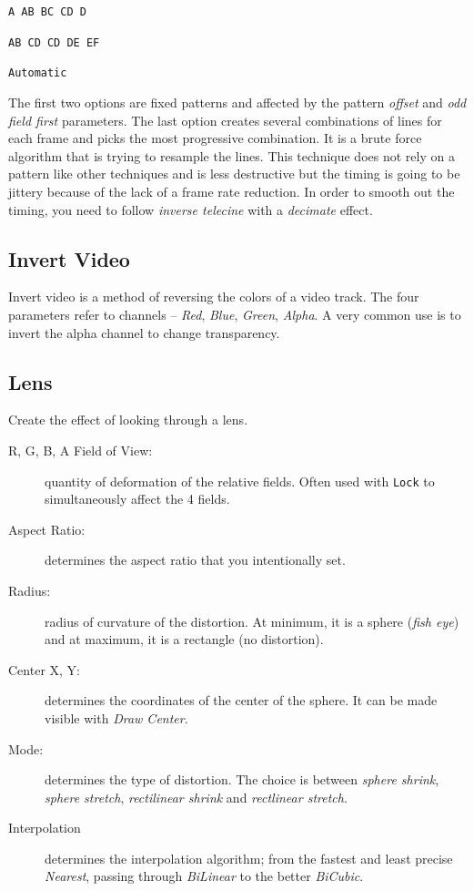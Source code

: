 \texttt{A AB BC CD D}
 
\texttt{AB CD CD DE EF} 

\texttt{Automatic}

The first two options are fixed patterns and affected by the pattern \textit{offset} and \textit{odd field first} parameters. The last option creates several combinations of lines for each frame and picks the most progressive combination. It is a brute force algorithm that is trying to resample the lines. This technique does not rely on a pattern like other techniques and is less destructive but the timing is going to be jittery because of the lack of a frame rate reduction. In order to smooth out the timing, you need to follow \textit{inverse telecine} with a \textit{decimate} effect.

\subsection{Invert Video}%
\label{sub:invert_video}

Invert video is a method of reversing the colors of a video track. The four parameters refer to channels -- \textit{Red}, \textit{Blue}, \textit{Green}, \textit{Alpha}. A very common use is to invert the alpha channel to change transparency.

\subsection{Lens}%
\label{sub:lens}

Create the effect of looking through a lens.

\begin{description}
    \item[R, G, B, A Field of View:] quantity of deformation of the relative fields. Often used with \texttt{Lock} to simultaneously affect the 4 fields.
    \item[Aspect Ratio:] determines the aspect ratio that you intentionally set.
    \item[Radius:] radius of curvature of the distortion. At minimum, it is a sphere (\textit{fish eye}) and at maximum, it is a rectangle (no distortion).
    \item[Center X, Y:] determines the coordinates of the center of the sphere. It can be made visible with \textit{Draw Center}.
    \item[Mode:] determines the type of distortion. The choice is between \textit{sphere shrink}, \textit{sphere stretch}, \textit{rectilinear shrink} and \textit{rectlinear stretch}.
    \item[Interpolation] determines the interpolation algorithm; from the fastest and least precise \textit{Nearest}, passing through \textit{BiLinear} to the better \textit{BiCubic}.
\end{description}

